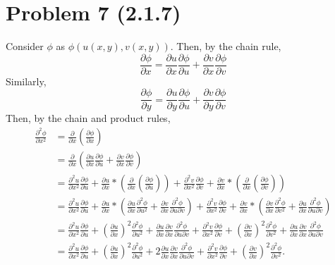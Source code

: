 \documentclass{article}
\begin{document}
\section{Problem 7 (2.1.7)}
Consider $\phi$ as $\phi(u(x,y),v(x,y))$. Then, by the chain rule, 
\begin{equation*}
    \frac{\partial\phi}{\partial x}=\frac{\partial u}{\partial x}\frac{\partial\phi}{\partial u}+\frac{\partial v}{\partial x}\frac{\partial\phi}{\partial v}
\end{equation*}
Similarly, 
\begin{equation*}
    \frac{\partial\phi}{\partial y}=\frac{\partial u}{\partial y}\frac{\partial\phi}{\partial u}+\frac{\partial v}{\partial y}\frac{\partial\phi}{\partial v}
\end{equation*}
Then, by the chain and product rules,
\begin{equation*}
\begin{split}
    \frac{\partial^2\phi}{\partial x^2}&=
    \frac{\partial}{\partial x}(\frac{\partial\phi}{\partial x})\\&=
    \frac{\partial}{\partial x}(\frac{\partial u}{\partial x}\frac{\partial\phi}{\partial u}+\frac{\partial v}{\partial x}\frac{\partial\phi}{\partial v})\\&=
    \frac{\partial^2 u}{\partial x^2}\frac{\partial \phi}{\partial u}+\frac{\partial u}{\partial x}*(\frac{\partial }{\partial x}(\frac{\partial \phi}{\partial u}))+\frac{\partial^2 v}{\partial x^2}\frac{\partial \phi}{\partial v}+\frac{\partial v}{\partial x}*(\frac{\partial }{\partial x}(\frac{\partial \phi}{\partial v}))\\&=
    \frac{\partial^2 u}{\partial x^2}\frac{\partial \phi}{\partial u}+\frac{\partial u}{\partial x}*(\frac{\partial u}{\partial x}\frac{\partial^2 \phi}{\partial u^2}+\frac{\partial v}{\partial x}\frac{\partial^2 \phi}{\partial u \partial v})+\frac{\partial^2 v}{\partial x^2}\frac{\partial \phi}{\partial v}+\frac{\partial v}{\partial x}*(\frac{\partial  v}{\partial x}\frac{\partial^2 \phi}{\partial v^2}+\frac{\partial u}{\partial x}\frac{\partial^2 \phi}{\partial u \partial v})\\&=
    \frac{\partial^2 u}{\partial x^2}\frac{\partial \phi}{\partial u}+(\frac{\partial u}{\partial x})^2\frac{\partial^2 \phi}{\partial u^2}+\frac{\partial u}{\partial x}\frac{\partial v}{\partial x}\frac{\partial^2 \phi}{\partial u \partial v}+\frac{\partial^2 v}{\partial x^2}\frac{\partial \phi}{\partial v}+(\frac{\partial v}{\partial x})^2\frac{\partial^2 \phi}{\partial v^2}+\frac{\partial u}{\partial x}\frac{\partial v}{\partial x}\frac{\partial^2 \phi}{\partial u \partial v}\\&=
    \frac{\partial^2 u}{\partial x^2}\frac{\partial \phi}{\partial u}+(\frac{\partial u}{\partial x})^2\frac{\partial^2 \phi}{\partial u^2}+2\frac{\partial u}{\partial x}\frac{\partial v}{\partial x}\frac{\partial^2 \phi}{\partial u \partial v}+\frac{\partial^2 v}{\partial x^2}\frac{\partial \phi}{\partial v}+(\frac{\partial v}{\partial x})^2\frac{\partial^2 \phi}{\partial v^2}.
\end{split}
\end{equation*}
\end{document}
